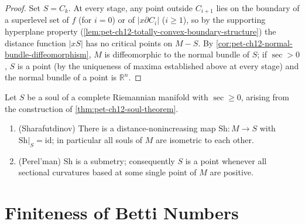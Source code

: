 \begin{proof}
  Set $S=C_k$. At every stage, any point outside $C_{i+1}$ lies on the boundary
  of a superlevel set of $f$ (for $i=0$) or of $|x\partial C_i|$ ($i\ge1$), so
  by the supporting hyperplane property
  (\cref{lem:pet-ch12-totally-convex-boundary-structure}) the distance function
  $|xS|$ has no critical points on $M-S$. By
  \cref{cor:pet-ch12-normal-bundle-diffeomorphism}, $M$ is diffeomorphic to the
  normal bundle of $S$; if $\sec>0$, $S$ is a point (by the uniqueness of
  maxima established above at every stage) and the normal bundle of a point is
  $\mathbb{R}^n$.
\end{proof}

\begin{theorem}
  \label{thm:pet-ch12-soul-uniqueness-submetry}
  Let $S$ be a soul of a complete Riemannian manifold with $\sec\ge0$, arising
  from the construction of \cref{thm:pet-ch12-soul-theorem}.
  \begin{enumerate}
    \item (Sharafutdinov) There is a distance-nonincreasing map
      $\mathrm{Sh}:M\to S$ with $\mathrm{Sh}|_S=\mathrm{id}$; in particular all
      souls of $M$ are isometric to each other.
    \item (Perel'man) $\mathrm{Sh}$ is a submetry; consequently $S$ is a point
      whenever all sectional curvatures based at some single point of $M$ are
      positive.
  \end{enumerate}
\end{theorem}

\section{Finiteness of Betti Numbers}

